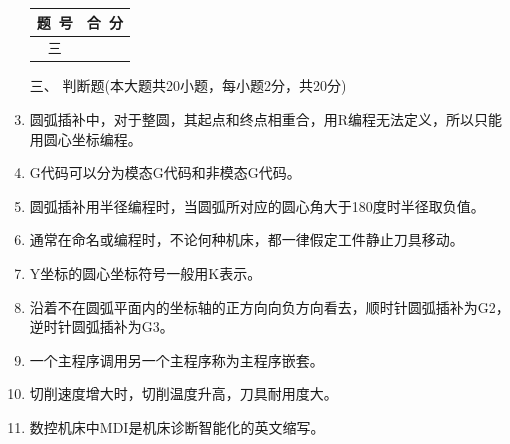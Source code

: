 \documentclass[12pt,twocolumn,landscape,UTF8,twoside]{ctexart}
\begin{document}
\begin{spacing}{1.3}
\begin{enumerate} [1、]
\vspace{1cm}			
\item[\heiti
\begin{minipage}{\@}	\begin{tabular}{|c|c|}\hline
题~号 & 合~分\\ \hline		三&       \\\hline	\end{tabular}\end{minipage} ]
\item[\heiti 三、]{\heiti 判断题(本大题共20小题，每小题2分，共20分)}
		
\item 圆弧插补中，对于整圆，其起点和终点相重合，用R编程无法定义，所以只能用圆心坐标编程。
\item G代码可以分为模态G代码和非模态G代码。
\item 圆弧插补用半径编程时，当圆弧所对应的圆心角大于180度时半径取负值。
\item 通常在命名或编程时，不论何种机床，都一律假定工件静止刀具移动。
\item Y坐标的圆心坐标符号一般用K表示。
\item 沿着不在圆弧平面内的坐标轴的正方向向负方向看去，顺时针圆弧插补为G2，逆时针圆弧插补为G3。
\item 一个主程序调用另一个主程序称为主程序嵌套。
\item 切削速度增大时，切削温度升高，刀具耐用度大。
\item 数控机床中MDI是机床诊断智能化的英文缩写。

\end{enumerate}
\end{spacing}
\end{document}
